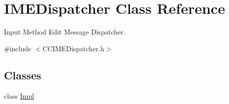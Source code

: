 \hypertarget{classIMEDispatcher}{}\section{I\+M\+E\+Dispatcher Class Reference}
\label{classIMEDispatcher}


Input Method Edit Message Dispatcher.  




{\ttfamily \#include $<$C\+C\+I\+M\+E\+Dispatcher.\+h$>$}

\subsection*{Classes}
\begin{DoxyCompactItemize}
\item 
class \hyperlink{classIMEDispatcher_1_1Impl}{Impl}
\end{DoxyCompactItemize}
